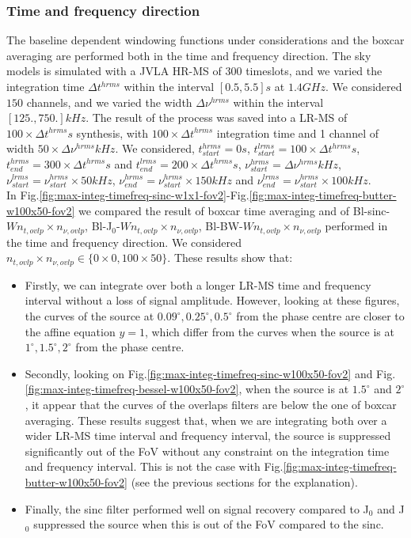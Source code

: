 \documentclass[useAMS,usenatbib]{mn2e}
\begin{document}
\subsubsection{Time and frequency direction}
The baseline dependent windowing functions under considerations and the boxcar averaging are performed both in the time and 
frequency direction. The sky models is simulated with a JVLA HR-MS of $300$ timeslots, and we varied  the integration time $\Delta 
t^{hrms}$ within the interval $[0.5,5.5]s$ at $1.4GHz$. We considered $150$ channels, and we varied the width $\Delta \nu^{hrms}$  
within the interval $[ 
125.,750.]kHz$.  The result of the process was saved into a LR-MS of  $100\times\Delta t^{hrms}s$ synthesis, with 
$100\times\Delta t^{hrms}$ integration time and 1 channel of width $50\times\Delta \nu^{hrms}kHz$.  We considered, 
$t^{hrms}_{start}=0s$, $t^{lrms}_{start}=100\times\Delta t^{hrms} s$, $t^{hrms}_{end}=300\times\Delta t^{hrms}s$ and 
$t^{lrms}_{end}=200\times\Delta t^{hrms}s$, $\nu^{hrms}_{start}=\Delta 
\nu^{hrms}kHz$, $\nu^{lrms}_{start}=\nu^{hrms}_{start}\times50 kHz$, $\nu^{hrms}_{end}=\nu^{hrms}_{start}\times150 kHz$ and 
$\nu^{lrms}_{end}=\nu^{hrms}_{start}\times100 kHz$.\\ 
In Fig.\ref{fig:max-integ-timefreq-sinc-w1x1-fov2}-Fig.\ref{fig:max-integ-timefreq-butter-w100x50-fov2} we compared the result of boxcar 
time
averaging and of  Bl-sinc-$W n_{t,ovlp}\times n_{\nu,ovlp}$, Bl-J$_0$-$W n_{t,ovlp}\times n_{\nu,ovlp}$, Bl-BW-$W n_{t,ovlp}\times 
n_{\nu,ovlp}$ performed in the time and frequency direction. We considered $n_{t,ovlp}\times n_{\nu,ovlp}\in\{0\times 0,100\times 50\}$. 
These results show that:
\begin{itemize}
 \item Firstly,  we can integrate over both a longer LR-MS time and frequency interval without a loss of signal 
amplitude. However, looking at these figures, the curves of the source at $0.09^{\circ},0.25^{\circ},0.5^{\circ}$ from the phase centre are 
closer to the affine equation $y=1$, which differ from the curves when the source is at $1^{\circ},1.5^{\circ}, 2^{\circ}$ from the phase 
centre.  
 \item Secondly, looking on Fig.\ref{fig:max-integ-timefreq-sinc-w100x50-fov2} and Fig.\ref{fig:max-integ-timefreq-bessel-w100x50-fov2}, 
when the 
source is at $1.5^{\circ}$ and $2^{\circ}$, it appear that the curves of the overlaps filters are below the one of boxcar averaging. These 
results suggest that, when we are integrating both over a wider LR-MS time interval and frequency interval, the source is suppressed 
significantly out of the FoV without any constraint on the integration time and frequency interval.  This is 
not the case with Fig.\ref{fig:max-integ-timefreq-butter-w100x50-fov2} (see the previous sections for the explanation).
 \item Finally, the sinc filter performed well on signal recovery compared to J$_0$ and J$_0$ suppressed 
the source when this is out of the FoV compared to the sinc. 
\end{itemize}
\end{document}
